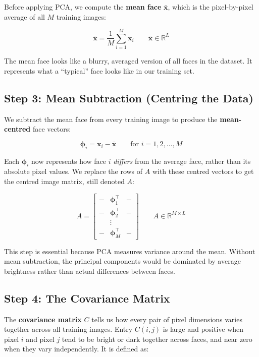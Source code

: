 \documentclass[12pt,a4paper]{article}
\begin{document}
Before applying PCA, we compute the \textbf{mean face} $\bar{\mathbf{x}}$, which is
the pixel-by-pixel average of all $M$ training images:

\[
\bar{\mathbf{x}} = \frac{1}{M} \sum_{i=1}^{M} \mathbf{x}_i
\qquad \bar{\mathbf{x}} \in \mathbb{R}^L
\]

The mean face looks like a blurry, averaged version of all faces in the dataset.
It represents what a ``typical'' face looks like in our training set.

\subsection{Step 3: Mean Subtraction (Centring the Data)}

We subtract the mean face from every training image to produce the
\textbf{mean-centred} face vectors:

\[
\boldsymbol{\phi}_i = \mathbf{x}_i - \bar{\mathbf{x}}
\qquad \text{for } i = 1, 2, \ldots, M
\]

Each $\boldsymbol{\phi}_i$ now represents how face $i$ \textit{differs} from the
average face, rather than its absolute pixel values. We replace the rows of $A$
with these centred vectors to get the centred image matrix, still denoted $A$:

\[
A =
\begin{bmatrix}
- & \boldsymbol{\phi}_1^\top & - \\
- & \boldsymbol{\phi}_2^\top & - \\
  & \vdots                   &   \\
- & \boldsymbol{\phi}_M^\top & -
\end{bmatrix}
\qquad A \in \mathbb{R}^{M \times L}
\]

This step is essential because PCA measures variance around the mean. Without
mean subtraction, the principal components would be dominated by average brightness
rather than actual differences between faces.

\subsection{Step 4: The Covariance Matrix}

The \textbf{covariance matrix} $C$ tells us how every pair of pixel dimensions
varies together across all training images. Entry $C(i,j)$ is large and positive
when pixel $i$ and pixel $j$ tend to be bright or dark together across faces, and
near zero when they vary independently. It is defined as:
\end{document}
